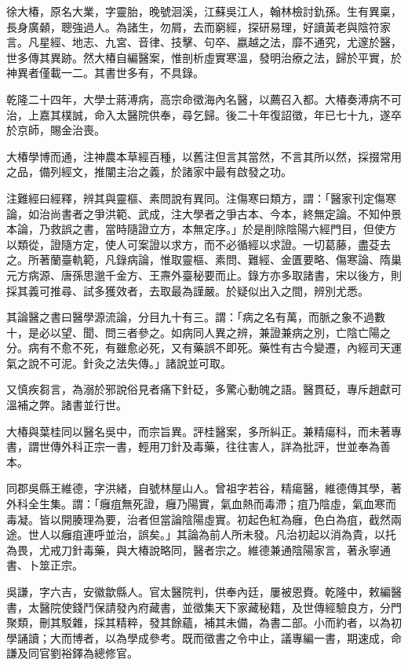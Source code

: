 \begin{pinyinscope}
徐大椿，原名大業，字靈胎，晚號洄溪，江蘇吳江人，翰林檢討釚孫。生有異稟，長身廣顙，聰強過人。為諸生，勿屑，去而窮經，探研易理，好讀黃老與陰符家言。凡星經、地志、九宮、音律、技擊、句卒、嬴越之法，靡不通究，尤邃於醫，世多傳其異跡。然大椿自編醫案，惟剖析虛實寒溫，發明治療之法，歸於平實，於神異者僅載一二。其書世多有，不具錄。

乾隆二十四年，大學士蔣溥病，高宗命徵海內名醫，以薦召入都。大椿奏溥病不可治，上嘉其樸誠，命入太醫院供奉，尋乞歸。後二十年復詔徵，年已七十九，遂卒於京師，賜金治喪。

大椿學博而通，注神農本草經百種，以舊注但言其當然，不言其所以然，採掇常用之品，備列經文，推闡主治之義，於諸家中最有啟發之功。

注難經曰經釋，辨其與靈樞、素問說有異同。注傷寒曰類方，謂：「醫家刊定傷寒論，如治尚書者之爭洪範、武成，注大學者之爭古本、今本，終無定論。不知仲景本論，乃救誤之書，當時隨證立方，本無定序。」於是削除陰陽六經門目，但使方以類從，證隨方定，使人可案證以求方，而不必循經以求證。一切葛藤，盡芟去之。所著蘭臺軌範，凡錄病論，惟取靈樞、素問、難經、金匱要略、傷寒論、隋巢元方病源、唐孫思邈千金方、王燾外臺秘要而止。錄方亦多取諸書，宋以後方，則採其義可推尋、試多獲效者，去取最為謹嚴。於疑似出入之間，辨別尤悉。

其論醫之書曰醫學源流論，分目九十有三。謂：「病之名有萬，而脈之象不過數十，是必以望、聞、問三者參之。如病同人異之辨，兼證兼病之別，亡陰亡陽之分。病有不愈不死，有雖愈必死，又有藥誤不即死。藥性有古今變遷，內經司天運氣之說不可泥。針灸之法失傳。」諸說並可取。

又慎疾芻言，為溺於邪說俗見者痛下針砭，多驚心動魄之語。醫貫砭，專斥趙獻可溫補之弊。諸書並行世。

大椿與葉桂同以醫名吳中，而宗旨異。評桂醫案，多所糾正。兼精瘍科，而未著專書，謂世傳外科正宗一書，輕用刀針及毒藥，往往害人，詳為批評，世並奉為善本。

同郡吳縣王維德，字洪緒，自號林屋山人。曾祖字若谷，精瘍醫，維德傳其學，著外科全生集。謂：「癰疽無死證，癰乃陽實，氣血熱而毒滯；疽乃陰虛，氣血寒而毒凝。皆以開腠理為要，治者但當論陰陽虛實。初起色紅為癰，色白為疽，截然兩途。世人以癰疽連呼並治，誤矣。」其論為前人所未發。凡治初起以消為貴，以托為畏，尤戒刀針毒藥，與大椿說略同，醫者宗之。維德兼通陰陽家言，著永寧通書、卜筮正宗。

吳謙，字六吉，安徽歙縣人。官太醫院判，供奉內廷，屢被恩賚。乾隆中，敕編醫書，太醫院使錢鬥保請發內府藏書，並徵集天下家藏秘籍，及世傳經驗良方，分門聚類，刪其駁雜，採其精粹，發其餘蘊，補其未備，為書二部。小而約者，以為初學誦讀；大而博者，以為學成參考。既而徵書之令中止，議專編一書，期速成，命謙及同官劉裕鐸為總修官。


\end{pinyinscope}

